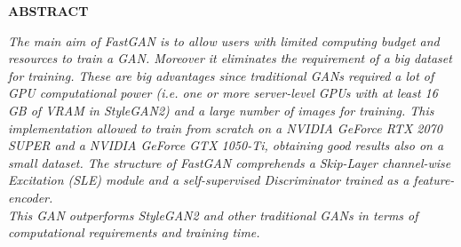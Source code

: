 \documentclass[12pt]{article}
\begin{document}
\begin{center}
	
	\normalsize\MakeUppercase{\textbf{Abstract}\vspace*{0.35cm}}
	
	\begin{minipage}[t]{0.6\textwidth}
	\textit{The main aim of FastGAN is to allow users with limited computing budget and resources to 
	train a GAN. Moreover it eliminates the requirement of a big dataset for training.
	These are big advantages since traditional GANs required a lot of GPU computational power
	(i.e. one or more server-level GPUs with at least 16 GB of VRAM in StyleGAN2) and a large number of 
	images for training. 
	This implementation allowed to train from scratch on a NVIDIA GeForce RTX 2070 SUPER and a 
	NVIDIA GeForce GTX 1050-Ti, obtaining good results also on a small dataset. 
	The structure of FastGAN comprehends a Skip-Layer channel-wise Excitation (SLE) module and a self-supervised
	Discriminator trained as a feature-encoder.\\
	This GAN outperforms StyleGAN2 and other traditional GANs in terms of computational requirements
	and training time.
	}
	\end{minipage}

\end{center}

\vspace*{1cm}
\end{document}
